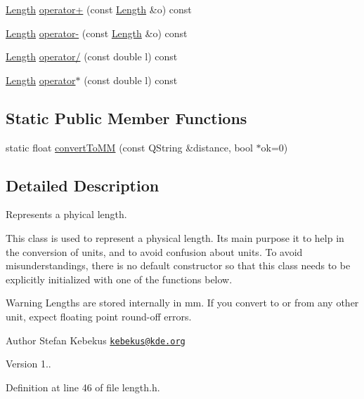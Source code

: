 \begin{DoxyCompactItemize}
\item 
\hyperlink{classLength}{Length} \hyperlink{classLength_a23d66c3c7ba169db17e0a7ceceeb2f98}{operator+} (const \hyperlink{classLength}{Length} \&o) const 
\item 
\hyperlink{classLength}{Length} \hyperlink{classLength_ac56fc20eb70031e0d1d1165fddf52726}{operator-\/} (const \hyperlink{classLength}{Length} \&o) const 
\item 
\hyperlink{classLength}{Length} \hyperlink{classLength_a9a6192bf1623558814b61c7988c305f5}{operator/} (const double l) const 
\item 
\hyperlink{classLength}{Length} \hyperlink{classLength_aed7c0c6752ff0928213d279618c0ebbf}{operator$\ast$} (const double l) const 
\end{DoxyCompactItemize}
\subsection*{Static Public Member Functions}
\begin{DoxyCompactItemize}
\item 
static float \hyperlink{classLength_a0831070f01a1220c5741f087e0585373}{convert\+To\+M\+M} (const Q\+String \&distance, bool $\ast$ok=0)
\end{DoxyCompactItemize}


\subsection{Detailed Description}
Represents a phyical length. 

This class is used to represent a physical length. Its main purpose it to help in the conversion of units, and to avoid confusion about units. To avoid misunderstandings, there is no default constructor so that this class needs to be explicitly initialized with one of the functions below.

\begin{DoxyWarning}{Warning}
Lengths are stored internally in mm. If you convert to or from any other unit, expect floating point round-\/off errors.
\end{DoxyWarning}
\begin{DoxyAuthor}{Author}
Stefan Kebekus \href{mailto:kebekus@kde.org}{\tt kebekus@kde.\+org} 
\end{DoxyAuthor}
\begin{DoxyVersion}{Version}
1.. 
\end{DoxyVersion}


Definition at line 46 of file length.\+h.



